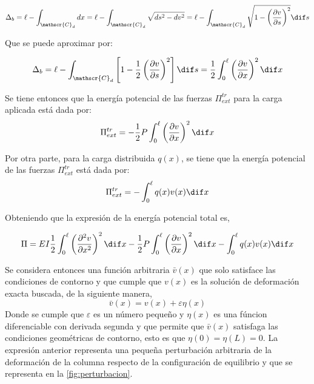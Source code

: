 \begin{equation}
\Delta_b = \ell - \int_{\mathscr{C}_d} dx = \ell - \int_{\mathscr{C}_d} \sqrt{ds^2-dv^2} = \ell - 
\int_{\mathscr{C}_d} \sqrt{1-\left(\frac{\partial v}{\partial s}\right)^2} \dif s
\end{equation}

Que se puede aproximar por:

\begin{equation}\label{eqn:deltab}
\Delta_b = \ell - \int_{\mathscr{C}_d} \left[1 - \frac{1}{2}\left(\frac{\partial v}{\partial s}\right)^2\right] \dif s = \frac{1}{2} \int_0^\ell \left(\frac{\partial v}{\partial x}\right)^2 \dif x
\end{equation}

Se tiene entonces que la energía potencial de las fuerzas $\Pi^{tr}_{ext}$ para la carga aplicada está dada por:
\begin{equation}
\Pi_{ext}^{tr} = -\frac{1}{2} P \int_0^\ell  \left(\frac{\partial v}{\partial x}\right)^2 \dif x
\end{equation}

Por otra parte, para la carga distribuida $q(x)$, se tiene que la energía potencial de las fuerzas $\Pi^{tr}_{ext}$ está dada por:
\begin{equation}
\Pi_{ext}^{tr} =
- \int_0^\ell q(x) v(x) \dif x
\end{equation}

Obteniendo que la expresión de la energía potencial total es,

\begin{equation}\label{eqn:energiatotal}
\Pi = E I \frac{1}{2} \int_0^\ell \left( \frac{\partial^2 v}{\partial x^2}\right)^2 \dif x -\frac{1}{2} P \int_0^\ell  \left(\frac{\partial v}{\partial x}\right)^2 \dif x - \int_0^\ell q(x) v(x) \dif x
\end{equation}

Se considera entonces una función arbitraria $\bar{v}(x)$ que solo satisface las condiciones de contorno y que cumple que $v(x)$ es la solución de deformación exacta buscada, de la siguiente manera,
\begin{equation}\label{eqn:funcionv}
\bar{v}(x)=v(x)+\varepsilon\eta(x)
\end{equation}
Donde se cumple que $\varepsilon$ es un número pequeño y $\eta(x)$ es una fúncion diferenciable con derivada segunda y que permite que $\bar{v}(x)$ satisfaga las condiciones geométricas de contorno, esto es que $\eta(0)=\eta(L)=0$.
La expresión anterior representa una pequeña perturbación arbitraria de la deformación de la columna respecto de la configuración de equilibrio y que se representa en la \autoref{fig:perturbacion}.

